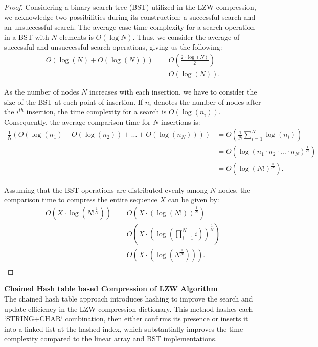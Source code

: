 \documentclass[12pt, a4paper]{article}
\begin{document}
\begin{proof}
Considering a binary search tree (BST) utilized in the LZW compression, we acknowledge two possibilities during its construction: a successful search and an unsuccessful search. The average case time complexity for a search operation in a BST with \( N \) elements is \( O(\log N) \). Thus, we consider the average of successful and unsuccessful search operations, giving us the following:
\begin{align*}
O(\log(N) + O(\log(N))) &= O\left(\frac{2 \cdot \log(N)}{2}\right) \\
&= O(\log(N)).
\end{align*}

As the number of nodes \( N \) increases with each insertion, we have to consider the size of the BST at each point of insertion. If \( n_i \) denotes the number of nodes after the \( i^{th} \) insertion, the time complexity for a search is \( O(\log(n_i)) \). Consequently, the average comparison time for \( N \) insertions is:
\begin{align*}
\frac{1}{N} (O(\log(n_1) + O(\log(n_2)) + \dots + O(\log(n_N)))) &= O\left(\frac{1}{N} \sum_{i=1}^{N} \log(n_i)\right) \\
&= O\left(\log\left(n_1 \cdot n_2 \cdot \ldots \cdot n_N\right)^{\frac{1}{N}}\right) \\
&= O\left(\log\left(N!\right)^{\frac{1}{N}}\right).
\end{align*}

Assuming that the BST operations are distributed evenly among \( N \) nodes, the comparison time to compress the entire sequence \( X \) can be given by:
\begin{align*}
O(X \cdot \log(N!^{\frac{1}{N}})) &= O(X \cdot (\log(N!))^{\frac{1}{N}}) \\
&= O\left(X \cdot \left(\log\left(\prod_{i=1}^{N} i\right)\right)^{\frac{1}{N}}\right) \\
&= O(X \cdot (\log (N^{\frac{1}{N}}))).\\
\end{align*}
\end{proof}
\textbf{ Chained Hash table based Compression of LZW Algorithm}
\\
The chained hash table approach introduces hashing to improve the search and update efficiency in the LZW compression dictionary. This method hashes each `STRING+CHAR` combination, then either confirms its presence or inserts it into a linked list at the hashed index, which substantially improves the time complexity compared to the linear array and BST implementations.
\end{document}
